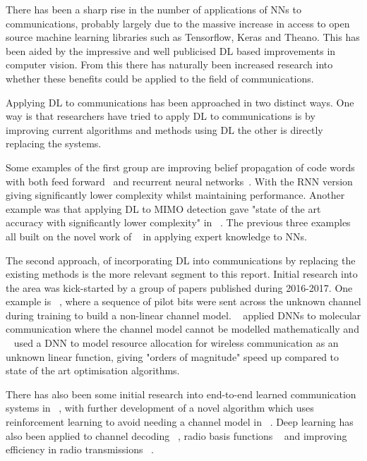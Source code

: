 \documentclass[12pt,onecolumn,letterpaper]{article}
\begin{document}
There has been a sharp rise in the number of applications of NNs to communications, probably largely due to the massive increase in access to open source machine learning libraries such as Tensorflow, Keras and Theano. This has been aided by the impressive and well publicised DL based improvements in computer vision. From this there has naturally been increased research into whether these benefits could be applied to the field of communications.

Applying DL to communications has been approached in two distinct ways. One way is that researchers have tried to apply DL to communications is by improving current algorithms and methods using DL the other is directly replacing the systems. 

Some examples of the first group are improving belief propagation of code words with both feed forward~\cite{AppsNnBeliefPropogation} and recurrent neural networks~\cite{AppsRnnBeliefPropogation}. With the RNN version giving significantly lower complexity whilst maintaining performance. Another example was that applying DL to MIMO detection gave "state of the art accuracy with significantly lower complexity" in ~\cite{AppsNnDeepMimoDetection}. The previous three examples all built on the novel work of ~\cite{AppsNnDeepUnfolding} in applying expert knowledge to NNs.

The second approach, of incorporating DL into communications by replacing the existing methods is the more relevant segment to this report. Initial research into the area was kick-started by a group of papers published during 2016-2017. One example is ~\cite{AppsMimoBlindDetection}, where a sequence of pilot bits were sent across the unknown channel during training to build a non-linear channel model. ~\cite{AppsMolecularComms} applied DNNs to molecular communication where the channel model cannot be modelled mathematically and ~\cite{AppsResourceAllocation} used a DNN to model resource allocation for wireless communication as an unknown linear function, giving "orders of magnitude" speed up compared to state of the art optimisation algorithms.

There has also been some initial research into end-to-end learned communication systems in ~\cite{oShea,oShea0}, with further development of a novel algorithm which uses reinforcement learning to avoid needing a channel model in ~\cite{Aoudia}. Deep learning has also been applied to channel decoding ~\cite{AppsDlChannelDecoding}, radio basis functions ~\cite{AppsRadioBasisFunctions} and improving efficiency in radio transmissions ~\cite{AppsCnnRadioEfficiency}.
\end{document}
